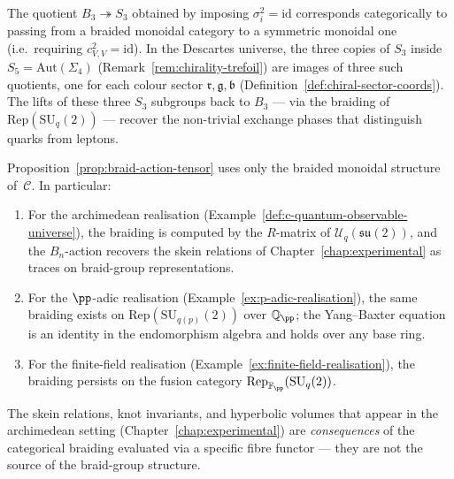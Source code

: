 \begin{remark}
\label{rem:symmetric-quotient-colour}
The quotient $B_3 \twoheadrightarrow S_3$ obtained by imposing
$\sigma_i^2 = \mathrm{id}$ corresponds categorically to passing from a
braided monoidal category to a symmetric monoidal one (i.e.\ requiring
$c_{V,V}^2 = \mathrm{id}$).  In the Descartes universe, the three copies of
$S_3$ inside $S_5 = \mathrm{Aut}(\Sigma_4)$
(Remark~\ref{rem:chirality-trefoil}) are images of three such quotients,
one for each colour sector $\mathfrak{r}, \mathfrak{g}, \mathfrak{b}$
(Definition~\ref{def:chiral-sector-coords}).  The lifts of these three
$S_3$ subgroups back to $B_3$ --- via the braiding of
$\mathrm{Rep}(\mathrm{SU}_q(2))$ --- recover the non-trivial exchange
phases that distinguish quarks from leptons.
\end{remark}

\begin{remark}
\label{rem:braid-base-field}
Proposition~\ref{prop:braid-action-tensor} uses only the braided monoidal
structure of~$\mathcal{C}$.  In particular:
\begin{enumerate}
  \item For the archimedean realisation
        (Example~\ref{def:c-quantum-observable-universe}), the braiding
        is computed by the $R$-matrix of
        $\mathcal{U}_q(\mathfrak{su}(2))$, and the $B_n$-action
        recovers the skein relations of Chapter~\ref{chap:experimental}
        as traces on braid-group representations.
  \item For the $\pp$-adic realisation
        (Example~\ref{ex:p-adic-realisation}), the same braiding exists
        on $\mathrm{Rep}(\mathrm{SU}_{q(p)}(2))$ over
        $\mathbb{Q}_\pp$; the Yang--Baxter equation is an identity in
        the endomorphism algebra and holds over any base ring.
  \item For the finite-field realisation
        (Example~\ref{ex:finite-field-realisation}), the braiding
        persists on the fusion category
        $\mathrm{Rep}_{\mathbb{F}_\pp}(\mathrm{SU}_q(2))$.
\end{enumerate}
The skein relations, knot invariants, and hyperbolic volumes that appear
in the archimedean setting (Chapter~\ref{chap:experimental}) are
\emph{consequences} of the categorical braiding evaluated via a specific
fibre functor --- they are not the source of the braid-group structure.
\end{remark}

